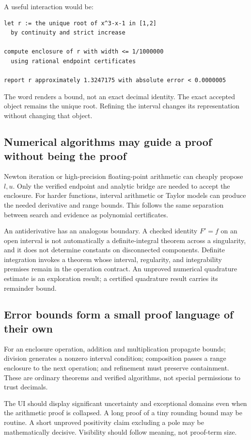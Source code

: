 \documentclass[11pt,a4paper]{article}
\newcommand{\code}[1]{\texttt{\detokenize{#1}}}
\theoremstyle{definition}
\theoremstyle{remark}
\begin{document}
A useful interaction would be:
\begin{lstlisting}
let r := the unique root of x^3-x-1 in [1,2]
  by continuity and strict increase

compute enclosure of r with width <= 1/1000000
  using rational endpoint certificates

report r approximately 1.3247175 with absolute error < 0.0000005
\end{lstlisting}
The word \code{report} renders a bound, not an exact decimal identity. The exact accepted object remains the unique root. Refining the interval changes its representation without changing that object.

\subsection{Numerical algorithms may guide a proof without being the proof}
Newton iteration or high-precision floating-point arithmetic can cheaply propose $l,u$. Only the verified endpoint and analytic bridge are needed to accept the enclosure. For harder functions, interval arithmetic or Taylor models can produce the needed derivative and range bounds. This follows the same separation between search and evidence as polynomial certificates.

An antiderivative has an analogous boundary. A checked identity $F'=f$ on an open interval is not automatically a definite-integral theorem across a singularity, and it does not determine constants on disconnected components. Definite integration invokes a theorem whose interval, regularity, and integrability premises remain in the operation contract. An unproved numerical quadrature estimate is an exploration result; a certified quadrature result carries its remainder bound.

\subsection{Error bounds form a small proof language of their own}
For an enclosure operation, addition and multiplication propagate bounds; division generates a nonzero interval condition; composition passes a range enclosure to the next operation; and refinement must preserve containment. These are ordinary theorems and verified algorithms, not special permissions to trust decimals.

The UI should display significant uncertainty and exceptional domains even when the arithmetic proof is collapsed. A long proof of a tiny rounding bound may be routine. A short unproved positivity claim excluding a pole may be mathematically decisive. Visibility should follow meaning, not proof-term size.
\end{document}
